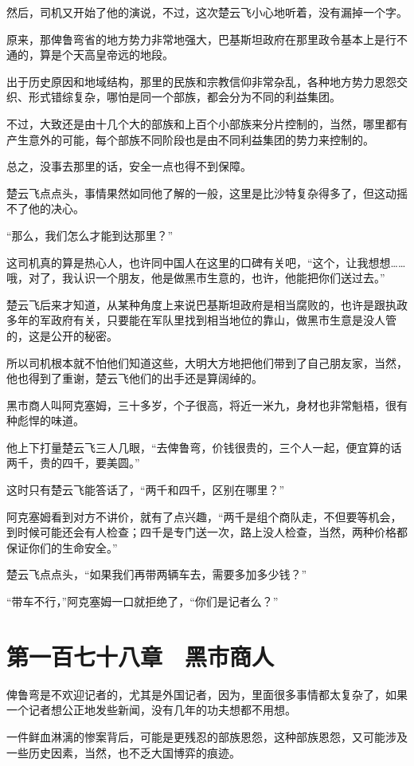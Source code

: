 然后，司机又开始了他的演说，不过，这次楚云飞小心地听着，没有漏掉一个字。

原来，那俾鲁弯省的地方势力非常地强大，巴基斯坦政府在那里政令基本上是行不通的，算是个天高皇帝远的地段。

出于历史原因和地域结构，那里的民族和宗教信仰非常杂乱，各种地方势力恩怨交织、形式错综复杂，哪怕是同一个部族，都会分为不同的利益集团。

不过，大致还是由十几个大的部族和上百个小部族来分片控制的，当然，哪里都有产生意外的可能，每个部族不同阶段也是由不同利益集团的势力来控制的。

总之，没事去那里的话，安全一点也得不到保障。

楚云飞点点头，事情果然如同他了解的一般，这里是比沙特复杂得多了，但这动摇不了他的决心。

“那么，我们怎么才能到达那里？”

这司机真的算是热心人，也许同中国人在这里的口碑有关吧，“这个，让我想想……哦，对了，我认识一个朋友，他是做黑市生意的，也许，他能把你们送过去。”

楚云飞后来才知道，从某种角度上来说巴基斯坦政府是相当腐败的，也许是跟执政多年的军政府有关，只要能在军队里找到相当地位的靠山，做黑市生意是没人管的，这是公开的秘密。

所以司机根本就不怕他们知道这些，大明大方地把他们带到了自己朋友家，当然，他也得到了重谢，楚云飞他们的出手还是算阔绰的。

黑市商人叫阿克塞姆，三十多岁，个子很高，将近一米九，身材也非常魁梧，很有种彪悍的味道。

他上下打量楚云飞三人几眼，“去俾鲁弯，价钱很贵的，三个人一起，便宜算的话两千，贵的四千，要美圆。”

这时只有楚云飞能答话了，“两千和四千，区别在哪里？”

阿克塞姆看到对方不讲价，就有了点兴趣，“两千是组个商队走，不但要等机会，到时候可能还会有人检查；四千是专门送一次，路上没人检查，当然，两种价格都保证你们的生命安全。”

楚云飞点点头，“如果我们再带两辆车去，需要多加多少钱？”

“带车不行，”阿克塞姆一口就拒绝了，“你们是记者么？”

\section{第一百七十八章　黑市商人}

俾鲁弯是不欢迎记者的，尤其是外国记者，因为，里面很多事情都太复杂了，如果一个记者想公正地发些新闻，没有几年的功夫想都不用想。

一件鲜血淋漓的惨案背后，可能是更残忍的部族恩怨，这种部族恩怨，又可能涉及一些历史因素，当然，也不乏大国博弈的痕迹。

